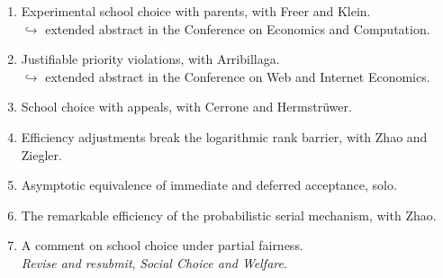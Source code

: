 \documentclass[11pt,a4paper]{article}
\begin{document}
\begin{enumerate}[leftmargin=*,itemsep=4pt,topsep=0pt]
	

	\item {Experimental school choice with parents}, with Freer and Klein.\\
	$\hookrightarrow$ extended abstract in the Conference on Economics and Computation.


	\item{Justifiable priority violations}, with Arribillaga.\\
	$\hookrightarrow$ extended abstract in the Conference on Web and Internet Economics.
		

	
	\item{School choice with appeals}, with Cerrone and Hermstrüwer.

	\item{Efficiency adjustments break the logarithmic rank barrier}, with Zhao and Ziegler.
		
		\item{Asymptotic equivalence of immediate and deferred acceptance}, solo.
		
	\item{The remarkable efficiency of the probabilistic serial mechanism}, with Zhao.

	\item{A comment on school choice under partial fairness}.\\
	\emph{Revise and resubmit}, \emph{Social Choice and Welfare}.
\end{enumerate}
\end{document}
